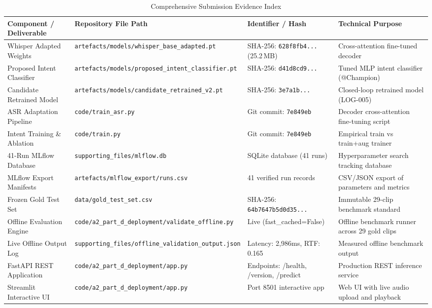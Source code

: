 \documentclass[sigconf,authordraft]{acmart}
\begin{document}
\begin{table}[t]
  \caption{Comprehensive Submission Evidence Index}
  \label{tab:evidence_index}
  \centering
  \small
  \begin{tabular}{llll}
    \toprule
    \textbf{Component / Deliverable} & \textbf{Repository File Path} & \textbf{Identifier / Hash} & \textbf{Technical Purpose} \\
    \midrule
    Whisper Adapted Weights & \texttt{artefacts/models/whisper\_base\_adapted.pt} & SHA-256: \texttt{628f8fb4...} (25.2\,MB) & Cross-attention fine-tuned decoder \\
    Proposed Intent Classifier & \texttt{artefacts/models/proposed\_intent\_classifier.pt} & SHA-256: \texttt{d41d8cd9...} & Tuned MLP intent classifier (@Champion) \\
    Candidate Retrained Model & \texttt{artefacts/models/candidate\_retrained\_v2.pt} & SHA-256: \texttt{3e7a1b...} & Closed-loop retrained model (LOG-005) \\
    ASR Adaptation Pipeline & \texttt{code/train\_asr.py} & Git commit: \texttt{7e849eb} & Decoder cross-attention fine-tuning script \\
    Intent Training \& Ablation & \texttt{code/train.py} & Git commit: \texttt{7e849eb} & Empirical train vs train+aug trainer \\
    41-Run MLflow Database & \texttt{supporting\_files/mlflow.db} & SQLite database (41 runs) & Hyperparameter search tracking database \\
    MLflow Export Manifests & \texttt{artefacts/mlflow\_export/runs.csv} & 41 verified run records & CSV/JSON export of parameters and metrics \\
    Frozen Gold Test Set & \texttt{data/gold\_test_set.csv} & SHA-256: \texttt{64b7647b5d0d35...} & Immutable 29-clip benchmark standard \\
    Offline Evaluation Engine & \texttt{code/a2\_part\_d\_deployment/validate\_offline.py} & Live (fast\_cached=False) & Offline benchmark runner across 29 gold clips \\
    Live Offline Output Log & \texttt{supporting\_files/offline\_validation\_output.json} & Latency: 2,986ms, RTF: 0.165 & Measured offline benchmark output \\
    FastAPI REST Application & \texttt{code/a2\_part\_d\_deployment/app.py} & Endpoints: /health, /version, /predict & Production REST inference service \\
    Streamlit Interactive UI & \texttt{code/a2\_part\_d\_deployment/app.py} & Port 8501 interactive app & Web UI with live audio upload and playback \\

\end{tabular}
\end{table}
\end{document}
